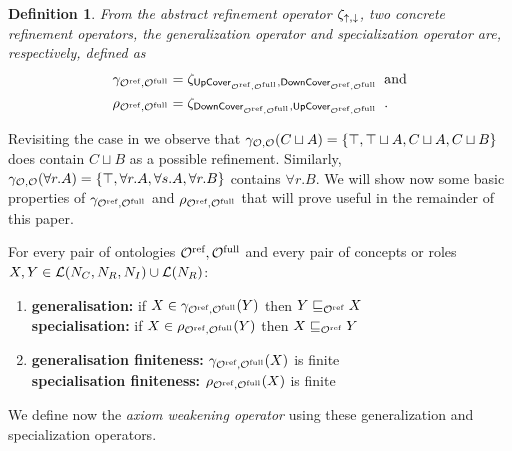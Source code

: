 \documentclass[
]{ceurart}
\newtheorem{definition}{Definition}
\begin{document}
\begin{definition}
  From the abstract refinement operator $\zeta_{\mathop{\uparrow},\mathop{\downarrow}}$, two concrete refinement operators, the \emph{generalization operator} and \emph{specialization operator} are, respectively, defined as
  {\footnotesize
  \begin{align*}
    \gamma_{{\mathcal{O}^\textnormal{ref}},{\mathcal{O}^\textnormal{full}}} &= \zeta_{{\mathsf{UpCover}}_{{\mathcal{O}^\textnormal{ref}},{\mathcal{O}^\textnormal{full}}},{\mathsf{DownCover}}_{{\mathcal{O}^\textnormal{ref}},{\mathcal{O}^\textnormal{full}}}} \enspace \text{and} \\
    \rho_{{\mathcal{O}^\textnormal{ref}},{\mathcal{O}^\textnormal{full}}} &= \zeta_{{\mathsf{DownCover}}_{{\mathcal{O}^\textnormal{ref}},{\mathcal{O}^\textnormal{full}}},{\mathsf{UpCover}}_{{\mathcal{O}^\textnormal{ref}},{\mathcal{O}^\textnormal{full}}}} \enspace.
  \end{align*}
  }
\end{definition}

Revisiting the case in  we observe that $\gamma_{\mathcal{O},\mathcal{O}}(C \sqcup A) = \{ \top, \top \sqcup A, C \sqcup A, C \sqcup B \}$ does contain $C \sqcup B$ as a possible refinement. Similarly, $\gamma_{\mathcal{O},\mathcal{O}}(\forall r.A) = \{ \top, \forall r.A, \forall s.A, \forall r.B \}$ contains $\forall r.B$. We will show now some basic properties of $\gamma_{{\mathcal{O}^\textnormal{ref}},{\mathcal{O}^\textnormal{full}}}$ and $\rho_{{\mathcal{O}^\textnormal{ref}},{\mathcal{O}^\textnormal{full}}}$ that will prove useful in the remainder of this paper.

\begin{lemma}\label{lem:basic}
  For every pair of \SROIQ ontologies ${\mathcal{O}^\textnormal{ref}}, {\mathcal{O}^\textnormal{full}}$ and every pair of concepts or roles $X, Y \in \mathcal{L}(N_C, N_R, N_I) \cup \mathcal{L}(N_R)$:
  \newcommand\litem[1]{\item{\bfseries #1:\enspace }}
  \begin{enumerate}
    \litem{generalisation}\label{lem:generalisation} if $X \in \gamma_{{\mathcal{O}^\textnormal{ref}},{\mathcal{O}^\textnormal{full}}}(Y)$ then $Y \sqsubseteq_{{\mathcal{O}^\textnormal{ref}}} X$ \\
    \textbf{specialisation:\enspace} if $X \in \rho_{{\mathcal{O}^\textnormal{ref}},{\mathcal{O}^\textnormal{full}}}(Y)$ then $X \sqsubseteq_{{\mathcal{O}^\textnormal{ref}}} Y$
    \litem{generalisation finiteness} $\gamma_{{\mathcal{O}^\textnormal{ref}},{\mathcal{O}^\textnormal{full}}}(X)$ is finite \\
    \textbf{specialisation finiteness:\enspace} $\rho_{{\mathcal{O}^\textnormal{ref}},{\mathcal{O}^\textnormal{full}}}(X)$ is finite
  \end{enumerate}
\end{lemma}

We define now the \emph{axiom weakening operator} using these generalization and specialization operators.
\end{document}
